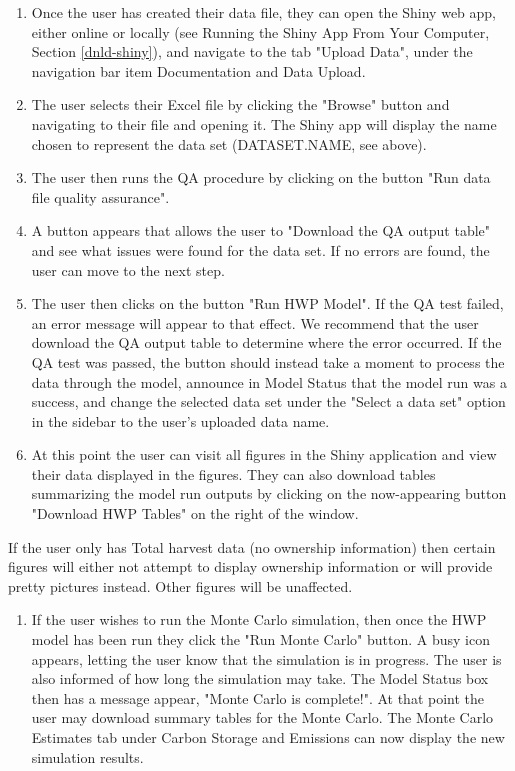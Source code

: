 \documentclass[
  openany]{book}
\providecommand{\tightlist}{%
  \setlength{\itemsep}{0pt}\setlength{\parskip}{0pt}}
\begin{document}
\begin{enumerate}
\def\labelenumi{\arabic{enumi}.}
\item
  Once the user has created their data file, they can open the Shiny web app, either online or locally (see Running the Shiny App From Your Computer, Section \ref{dnld-shiny}), and navigate to the tab "Upload Data", under the navigation bar item Documentation and Data Upload.
\item
  The user selects their Excel file by clicking the "Browse" button and navigating to their file and opening it. The Shiny app will display the name chosen to represent the data set (DATASET.NAME, see above).
\item
  The user then runs the QA procedure by clicking on the button "Run data file quality assurance".
\item
  A button appears that allows the user to "Download the QA output table" and see what issues were found for the data set. If no errors are found, the user can move to the next step.
\item
  The user then clicks on the button "Run HWP Model". If the QA test failed, an error message will appear to that effect. We recommend that the user download the QA output table to determine where the error occurred. If the QA test was passed, the button should instead take a moment to process the data through the model, announce in Model Status that the model run was a success, and change the selected data set under the "Select a data set" option in the sidebar to the user's uploaded data name.
\item
  At this point the user can visit all figures in the Shiny application and view their data displayed in the figures. They can also download tables summarizing the model run outputs by clicking on the now-appearing button "Download HWP Tables" on the right of the window.
\end{enumerate}

If the user only has Total harvest data (no ownership information) then certain figures will either not attempt to display ownership information or will provide pretty pictures instead. Other figures will be unaffected.

\begin{enumerate}
\def\labelenumi{\arabic{enumi}.}
\setcounter{enumi}{6}
\tightlist
\item
  If the user wishes to run the Monte Carlo simulation, then once the HWP model has been run they click the "Run Monte Carlo" button. A busy icon appears, letting the user know that the simulation is in progress. The user is also informed of how long the simulation may take. The Model Status box then has a message appear, "Monte Carlo is complete!". At that point the user may download summary tables for the Monte Carlo. The Monte Carlo Estimates tab under Carbon Storage and Emissions can now display the new simulation results.
\end{enumerate}
\end{document}
